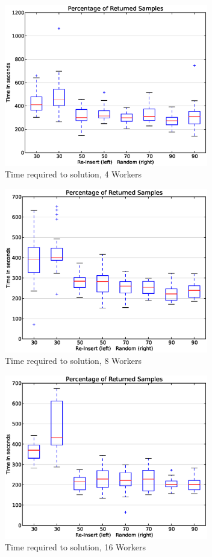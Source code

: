 \documentclass{llncs}
\begin{document}
\begin{figure}[t]
\centering
\includegraphics[width=3.5in]{plot_time_CRS_w4.eps}
\caption{Time required to solution, 4 Workers}
\label{fig:plot_time_ri_w4}
\end{figure}



\begin{figure}[!t]
\centering
\includegraphics[width=3.5in]{plot_time_CRS_w8.eps}
\caption{Time required to solution, 8 Workers}
\label{fig:plot_time_ri_w8}
\end{figure}


\begin{figure}[!t]
\centering
\includegraphics[width=3.5in]{plot_time_CRS_w16.eps}
\caption{Time required to solution, 16 Workers}
\label{fig:plot_time_ri_w16}
\end{figure}
\end{document}

